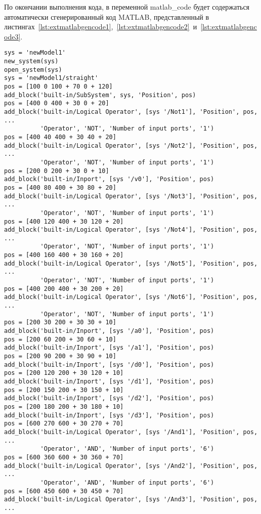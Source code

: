\documentclass[document.tex]{subfiles}
\begin{document}
По окончании выполнения кода, в переменной matlab{\_}code будет содержаться
автоматически сгенерированный код MATLAB, представленный в
листингах~\ref{lst:extmatlabgencode1},~\ref{lst:extmatlabgencode2}~и~\ref{lst:extmatlabgencode3}.

\clearpage
\begin{listing}[ht]
\begin{verbatim}
sys = 'newModel1'
new_system(sys)
open_system(sys)
sys = 'newModel1/straight'
pos = [100 0 100 + 70 0 + 120]
add_block('built-in/SubSystem', sys, 'Position', pos)
pos = [400 0 400 + 30 0 + 20]
add_block('built-in/Logical Operator', [sys '/Not1'], 'Position', pos, ...
          'Operator', 'NOT', 'Number of input ports', '1') 
pos = [400 40 400 + 30 40 + 20] 
add_block('built-in/Logical Operator', [sys '/Not2'], 'Position', pos, ... 
          'Operator', 'NOT', 'Number of input ports', '1')
pos = [200 0 200 + 30 0 + 10]
add_block('built-in/Inport', [sys '/v0'], 'Position', pos)
pos = [400 80 400 + 30 80 + 20]
add_block('built-in/Logical Operator', [sys '/Not3'], 'Position', pos, ...
          'Operator', 'NOT', 'Number of input ports', '1')
pos = [400 120 400 + 30 120 + 20]
add_block('built-in/Logical Operator', [sys '/Not4'], 'Position', pos, ...
          'Operator', 'NOT', 'Number of input ports', '1')
pos = [400 160 400 + 30 160 + 20]
add_block('built-in/Logical Operator', [sys '/Not5'], 'Position', pos, ...
          'Operator', 'NOT', 'Number of input ports', '1')
pos = [400 200 400 + 30 200 + 20]
add_block('built-in/Logical Operator', [sys '/Not6'], 'Position', pos, ...
          'Operator', 'NOT', 'Number of input ports', '1')
pos = [200 30 200 + 30 30 + 10]
add_block('built-in/Inport', [sys '/a0'], 'Position', pos)
pos = [200 60 200 + 30 60 + 10]
add_block('built-in/Inport', [sys '/a1'], 'Position', pos)
pos = [200 90 200 + 30 90 + 10]
add_block('built-in/Inport', [sys '/d0'], 'Position', pos)
pos = [200 120 200 + 30 120 + 10]
add_block('built-in/Inport', [sys '/d1'], 'Position', pos)
pos = [200 150 200 + 30 150 + 10]
add_block('built-in/Inport', [sys '/d2'], 'Position', pos)
pos = [200 180 200 + 30 180 + 10]
add_block('built-in/Inport', [sys '/d3'], 'Position', pos)
pos = [600 270 600 + 30 270 + 70]
add_block('built-in/Logical Operator', [sys '/And1'], 'Position', pos, ...
          'Operator', 'AND', 'Number of input ports', '6')
pos = [600 360 600 + 30 360 + 70]
add_block('built-in/Logical Operator', [sys '/And2'], 'Position', pos, ...
          'Operator', 'AND', 'Number of input ports', '6')
pos = [600 450 600 + 30 450 + 70]
add_block('built-in/Logical Operator', [sys '/And3'], 'Position', pos, ...

\end{verbatim}
\end{listing}
\end{document}
